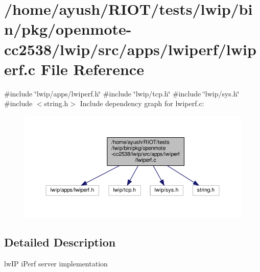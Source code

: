 \hypertarget{openmote-cc2538_2lwip_2src_2apps_2lwiperf_2lwiperf_8c}{}\section{/home/ayush/\+R\+I\+O\+T/tests/lwip/bin/pkg/openmote-\/cc2538/lwip/src/apps/lwiperf/lwiperf.c File Reference}
\label{openmote-cc2538_2lwip_2src_2apps_2lwiperf_2lwiperf_8c}
{\ttfamily \#include \char`\"{}lwip/apps/lwiperf.\+h\char`\"{}}\newline
{\ttfamily \#include \char`\"{}lwip/tcp.\+h\char`\"{}}\newline
{\ttfamily \#include \char`\"{}lwip/sys.\+h\char`\"{}}\newline
{\ttfamily \#include $<$string.\+h$>$}\newline
Include dependency graph for lwiperf.\+c\+:
\nopagebreak
\begin{figure}[H]
\begin{center}
\leavevmode
\includegraphics[width=350pt]{openmote-cc2538_2lwip_2src_2apps_2lwiperf_2lwiperf_8c__incl}
\end{center}
\end{figure}


\subsection{Detailed Description}
lw\+IP i\+Perf server implementation 